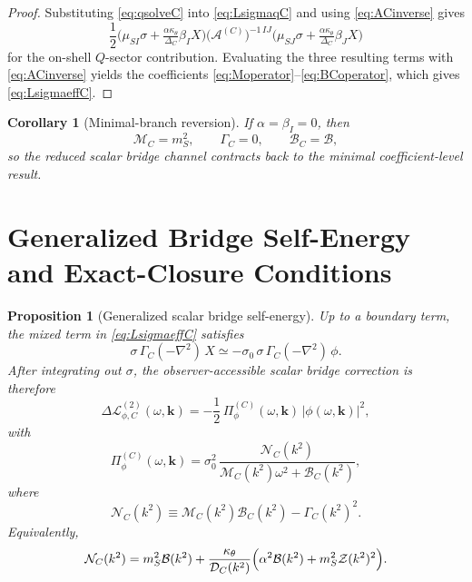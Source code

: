 \documentclass[11pt]{article}
\newtheorem{proposition}{Proposition}
\newtheorem{corollary}{Corollary}
\begin{document}
\begin{proof}
Substituting \eqref{eq:qsolveC} into \eqref{eq:LsigmaqC} and using \eqref{eq:ACinverse} gives
\[
\frac{1}{2}
\bigl(\mu_{SI}\sigma+\tfrac{\alpha\kappa_\theta}{\Delta_C}\beta_I X\bigr)
\bigl(\mathcal A^{(C)}\bigr)^{-1\,IJ}
\bigl(\mu_{SJ}\sigma+\tfrac{\alpha\kappa_\theta}{\Delta_C}\beta_J X\bigr)
\]
for the on-shell \(Q\)-sector contribution. Evaluating the three resulting terms with \eqref{eq:ACinverse} yields the coefficients \eqref{eq:Moperator}--\eqref{eq:BCoperator}, which gives \eqref{eq:LsigmaeffC}.
\end{proof}

\begin{corollary}[Minimal-branch reversion]
If \(\alpha=\beta_I=0\), then
\begin{equation}
\mathcal M_C=m_S^2,
\qquad
\Gamma_C=0,
\qquad
\mathcal B_C=\mathcal B,
\label{eq:reversioncheck}
\end{equation}
so the reduced scalar bridge channel contracts back to the minimal coefficient-level result.
\end{corollary}

\section{Generalized Bridge Self-Energy and Exact-Closure Conditions}

\begin{proposition}[Generalized scalar bridge self-energy]
Up to a boundary term, the mixed term in \eqref{eq:LsigmaeffC} satisfies
\begin{equation}
\sigma\,\Gamma_C(-\nabla^2)\,X
\simeq
-\sigma_0\,\sigma\,\Gamma_C(-\nabla^2)\,\phi.
\label{eq:boundarydrop}
\end{equation}
After integrating out \(\sigma\), the observer-accessible scalar bridge correction is therefore
\begin{equation}
\Delta\mathcal L_{\phi,C}^{(2)}(\omega,\mathbf{k})
=
-\frac{1}{2}\,
\Pi_\phi^{(C)}(\omega,\mathbf{k})\,|\phi(\omega,\mathbf{k})|^2,
\label{eq:DeltaphiC}
\end{equation}
with
\begin{equation}
\Pi_\phi^{(C)}(\omega,\mathbf{k})
=
\sigma_0^2\,
\frac{\mathcal N_C(k^2)}
{\mathcal M_C(k^2)\omega^2+\mathcal B_C(k^2)},
\label{eq:PiphiC}
\end{equation}
where
\begin{equation}
\mathcal N_C(k^2)
\equiv
\mathcal M_C(k^2)\mathcal B_C(k^2)-\Gamma_C(k^2)^2.
\label{eq:NCdef}
\end{equation}
Equivalently,
\begin{equation}
\mathcal N_C(k^2)
=
m_S^2\mathcal B(k^2)
+\frac{\kappa_\theta}
{\mathcal D_C(k^2)}
\Bigl(\alpha^2\mathcal B(k^2)+m_S^2\mathcal Z(k^2)^2\Bigr).
\label{eq:NCcompact}
\end{equation}
\end{proposition}
\end{document}
